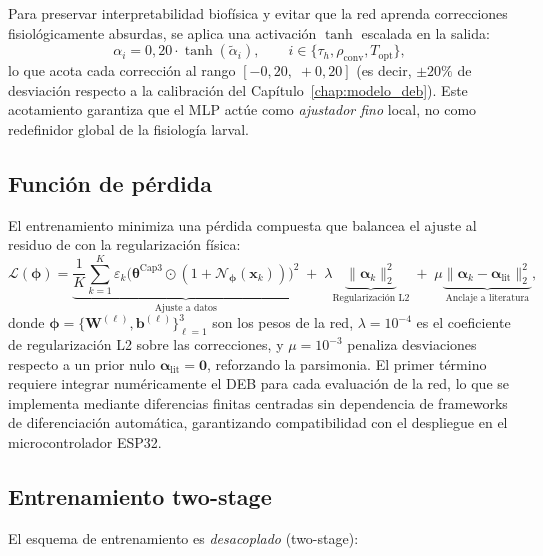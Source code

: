 Para preservar interpretabilidad biofísica y evitar que la red aprenda correcciones fisiológicamente absurdas, se aplica una activación $\tanh$ escalada en la salida:
\begin{equation}
\alpha_i = 0{,}20 \cdot \tanh(\tilde{\alpha}_i),
\qquad i \in \{\tau_h, \rho_{\mathrm{conv}}, T_{\mathrm{opt}}\},
\label{eq:activacion_salida}
\end{equation}
lo que acota cada corrección al rango $[-0{,}20,\;+0{,}20]$ (es decir, $\pm 20\%$ de desviación respecto a la calibración del Capítulo~\ref{chap:modelo_deb}). Este acotamiento garantiza que el MLP actúe como \emph{ajustador fino} local, no como redefinidor global de la fisiología larval.

\subsection{Función de pérdida}

El entrenamiento minimiza una pérdida compuesta que balancea el ajuste al residuo de  con la regularización física:
\begin{equation}
\mathcal{L}(\boldsymbol{\phi}) =
\underbrace{\frac{1}{K}\sum_{k=1}^{K} \varepsilon_k\bigl(\boldsymbol{\theta}^{\mathrm{Cap3}} \odot (1+\mathcal{N}_{\boldsymbol{\phi}}(\mathbf{x}_k))\bigr)^2}_{\text{Ajuste a datos}}
\;+\;
\lambda
\underbrace{\bigl\|\boldsymbol{\alpha}_k\bigr\|_{2}^{2}}_{\text{Regularización L2}}
\;+\;
\mu
\underbrace{\bigl\|\boldsymbol{\alpha}_k - \boldsymbol{\alpha}_{\mathrm{lit}}\bigr\|_{2}^{2}}_{\text{Anclaje a literatura}},
\label{eq:perdida_mlp}
\end{equation}
donde $\boldsymbol{\phi} = \{\mathbf{W}^{(\ell)}, \mathbf{b}^{(\ell)}\}_{\ell=1}^{3}$ son los pesos de la red, $\lambda = 10^{-4}$ es el coeficiente de regularización L2 sobre las correcciones, y $\mu = 10^{-3}$ penaliza desviaciones respecto a un prior nulo $\boldsymbol{\alpha}_{\mathrm{lit}} = \mathbf{0}$, reforzando la parsimonia. El primer término requiere integrar numéricamente el DEB para cada evaluación de la red, lo que se implementa mediante diferencias finitas centradas sin dependencia de frameworks de diferenciación automática, garantizando compatibilidad con el despliegue en el microcontrolador ESP32.

\subsection{Entrenamiento two-stage}

El esquema de entrenamiento es \emph{desacoplado} (two-stage):

